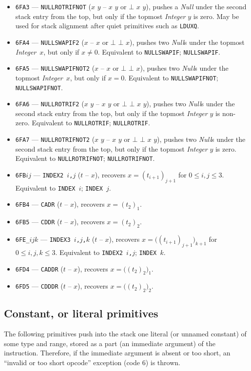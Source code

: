 \documentclass[12pt,oneside]{article}
\def\mysubsection#1{

    \subsection{#1}\fancyhead[C]{\small{\textsc{\textrm{\thesubsection.} #1}}}}
\begin{document}
\begin{itemize}
\item {\tt 6FA3} --- {\tt NULLROTRIFNOT} ($x$ $y$ -- $x$ $y$ or $\bot$ $x$ $y$), pushes a {\em Null\/} under the second stack entry from the top, but only if the topmost {\em Integer\/} $y$ is zero. May be used for stack alignment after quiet primitives such as {\tt LDUXQ}.
\item {\tt 6FA4} --- {\tt NULLSWAPIF2} ($x$ -- $x$ or $\bot$ $\bot$ $x$), pushes two {\em Null\/}s under the topmost {\em Integer\/}~$x$, but only if $x\neq0$. Equivalent to {\tt NULLSWAPIF}; {\tt NULLSWAPIF}.
\item {\tt 6FA5} --- {\tt NULLSWAPIFNOT2} ($x$ -- $x$ or $\bot$ $\bot$ $x$), pushes two {\em Null\/}s under the topmost {\em Integer\/}~$x$, but only if $x=0$. Equivalent to {\tt NULLSWAPIFNOT}; {\tt NULLSWAPIFNOT}.
\item {\tt 6FA6} --- {\tt NULLROTRIF2} ($x$ $y$ -- $x$ $y$ or $\bot$ $\bot$ $x$ $y$), pushes two {\em Null\/}s under the second stack entry from the top, but only if the topmost {\em Integer\/} $y$ is non-zero. Equivalent to {\tt NULLROTRIF}; {\tt NULLROTRIF}.
\item {\tt 6FA7} --- {\tt NULLROTRIFNOT2} ($x$ $y$ -- $x$ $y$ or $\bot$ $\bot$ $x$ $y$), pushes two {\em Null\/}s under the second stack entry from the top, but only if the topmost {\em Integer\/} $y$ is zero. Equivalent to {\tt NULLROTRIFNOT}; {\tt NULLROTRIFNOT}.
\item {\tt 6FB$ij$} --- {\tt INDEX2 $i$,$j$} ($t$ -- $x$), recovers $x=(t_{i+1})_{j+1}$ for $0\leq i,j\leq 3$. Equivalent to {\tt INDEX $i$}; {\tt INDEX $j$}.
\item {\tt 6FB4} --- {\tt CADR} ($t$ -- $x$), recovers $x=(t_2)_1$.
\item {\tt 6FB5} --- {\tt CDDR} ($t$ -- $x$), recovers $x=(t_2)_2$.
\item {\tt 6FE\_$ijk$} --- {\tt INDEX3 $i$,$j$,$k$} ($t$ -- $x$), recovers $x=\bigl((t_{i+1})_{j+1}\bigr)_{k+1}$ for $0\leq i,j,k\leq3$. Equivalent to {\tt INDEX2 $i$,$j$}; {\tt INDEX $k$}.
\item {\tt 6FD4} --- {\tt CADDR} ($t$ -- $x$), recovers $x=\bigl((t_2)_2\bigr)_1$.
\item {\tt 6FD5} --- {\tt CDDDR} ($t$ -- $x$), recovers $x=\bigl((t_2)_2\bigr)_2$.
\end{itemize}

\mysubsection{Constant, or literal primitives}

The following primitives push into the stack one literal (or unnamed constant) of some type and range, stored as a part (an immediate argument) of the instruction. Therefore, if the immediate argument is absent or too short, an ``invalid or too short opcode'' exception (code $6$) is thrown.
\end{document}
